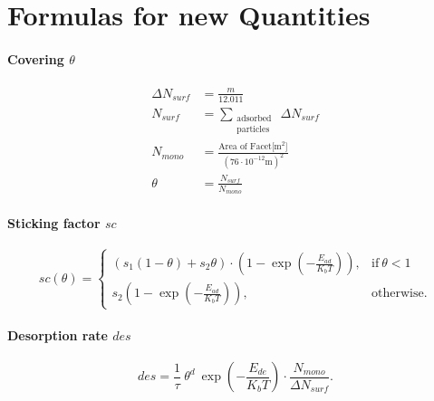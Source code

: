 
\chapter{Formulas for new Quantities}\label{chapter:Formulas}


\subsubsection*{Covering $\theta$}
\begin{equation}
	\begin{split}
		\Delta N_{surf}&=\frac{m}{12.011}\\
		N_{surf}&=\sum\limits_{\substack{\text{adsorbed}\\\text{particles}}}\ \Delta N_{surf}\\
		N_{mono}&=\frac{\text{Area of Facet[m$^2$]}}{(76 \cdot 10^{-12}\text{m})^2}\\
		\theta&=\frac{N_{surf}}{N_{mono}}
	\end{split}
\end{equation}

\subsubsection*{Sticking factor $sc$}
\begin{equation}
	sc(\theta)=
	\begin{cases}
		(s_1 (1-\theta) + s_2 \theta) \cdot (1 -  \exp({-\frac{E_{ad}}{K_b T}})), & \text{if}\ \theta < 1\\
		s_2 (1 -  \exp({-\frac{E_{ad}}{K_b T}})), & \text{otherwise}.
	\end{cases}
\end{equation}

\subsubsection*{Desorption rate $des$}
\begin{equation}
	des=\frac{1}{\tau}\ \theta^d\ \exp({-\frac{E_{de}}{K_b T}})\cdot \frac{N_{mono}}{\Delta N_{surf}}.
\end{equation}



